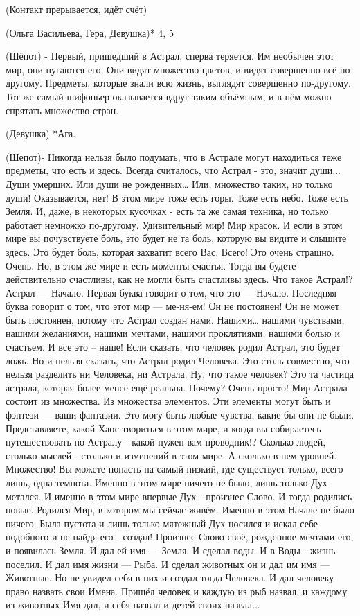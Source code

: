 (Контакт прерывается, идёт счёт)

(Ольга Васильева, Гера, Девушка)* 4, 5

(Шёпот)  - Первый, пришедший в Астрал, сперва теряется. Им необычен этот мир, они пугаются его. Они видят множество цветов, и видят совершенно всё по-другому. Предметы, которые знали всю жизнь, выглядят совершенно по-другому. Тот же самый шифоньер оказывается вдруг таким объёмным, и в нём можно спрятать множество стран. 

(Девушка)  *Ага.

(Шепот)-  Никогда нельзя было подумать, что в Астрале могут находиться теже предметы, что есть и здесь. Всегда считалось, что Астрал - это, значит души... Души умерших. Или души не рожденных… Или, множество таких, но только души! Оказывается, нет! В этом мире тоже есть горы.  Тоже есть небо. Тоже есть Земля. И, даже, в некоторых кусочках - есть та же самая техника, но только работает немножко по-другому. Удивительный мир! Мир красок. И если в этом мире вы почувствуете боль, это будет не та боль, которую вы видите и слышите здесь. Это будет боль, которая захватит всего Вас. Всего! Это очень страшно. Очень. Но, в этом же мире и есть моменты счастья. Тогда вы будете действительно счастливы, как не могли быть счастливы здесь. Что такое Астрал!? Астрал — Начало. Первая буква говорит о том, что это — Начало. Последняя буква говорит о том, что этот мир — ме-ня-ем! Он не постоянен! Он не может быть постоянен, потому что Астрал создан нами. Нашими… нашими чувствами, нашими желаниями, нашими мечтами, нашими проклятиями, нашими болью и счастьем. И все это – наше! Если сказать, что человек родил Астрал, это будет ложь. Но и нельзя сказать, что Астрал родил Человека. Это столь совместно, что нельзя разделить ни Человека, ни Астрала. Ну, что такое человек? Это та частица астрала, которая более-менее ещё реальна. Почему? Очень просто! Мир Астрала состоит из множества. Из множества элементов. Эти элементы могут быть и фэнтези — ваши фантазии. Это могу быть любые чувства, какие бы они не были. Представляете, какой Хаос твориться в этом мире, и когда вы собираетесь путешествовать по Астралу - какой нужен вам проводник!? Сколько людей, столько мыслей - столько и изменений в этом мире. А сколько в нем уровней. Множество! Вы можете попасть на самый низкий, где существует только,  всего лишь, одна темнота. Именно в этом мире ничего не было, лишь только Дух метался. И именно в этом мире впервые Дух - произнес Слово. И тогда родились новые. Родился Мир, в котором мы сейчас живём. Именно в этом Начале не было ничего. Была пустота и лишь только мятежный Дух носился и искал себе подобного и не найдя его  - создал! Произнес Слово своё, рожденное мечтами его, и появилась Земля. И дал ей имя — Земля. И сделал воды. И в Воды - жизнь поселил. И дал имя жизни — Рыба. И сделал животных он и дал им имя — Животные. Но не увидел себя в них и создал тогда Человека. И дал человеку право назвать свои Имена. Пришёл человек и каждую из рыб назвал, и каждому из животных Имя дал, и себя назвал и детей своих назвал...

